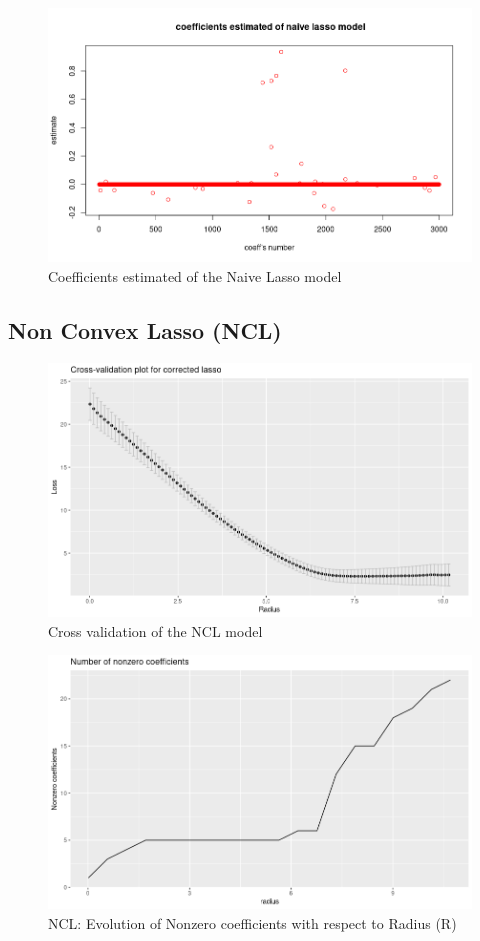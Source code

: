 \documentclass{report}
\begin{document}
\begin{figure}[H]
	\centering
		\includegraphics[scale=0.5]{pictures/cenl.png}
	\caption{Coefficients estimated of the Naive Lasso model}
	\label{t6}
\end{figure}

\subsection*{Non Convex Lasso (NCL) }
\begin{figure}[H]
	\centering
		\includegraphics[scale=0.5]{pictures/cvcl.png}
	\caption{Cross validation of the NCL model}
	\label{t7}
\end{figure}

\begin{figure}[H]
	\centering
		\includegraphics[scale=0.5]{pictures/nnccl.png}
	\caption{NCL: Evolution of Nonzero coefficients with respect to  Radius (R)}
	\label{t8}
\end{figure}
\end{document}
